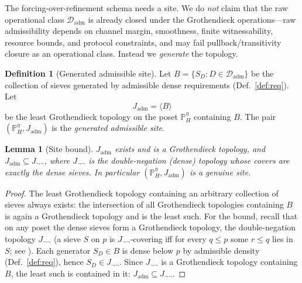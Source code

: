 \documentclass[11pt]{article}
\newtheorem{lemma}{Lemma}
\theoremstyle{definition}
\newtheorem{definition}{Definition}
\theoremstyle{remark}
\newcommand{\PHeta}{\mathbb{P}_{H}^{\eta}}
\newcommand{\refines}{\leq}
\newcommand{\Dadm}{\mathcal{D}_{\mathrm{adm}}}
\newcommand{\Jadm}{J_{\mathrm{adm}}}
\newcommand{\Jnn}{J_{\neg\neg}}
\begin{document}
The forcing-over-refinement schema needs a site. We do \emph{not} claim that the raw operational
class $\Dadm$ is already closed under the Grothendieck operations---raw admissibility depends on
channel margin, smoothness, finite witnessability, resource bounds, and protocol constraints, and may
fail pullback/transitivity closure as an operational class. Instead we \emph{generate} the topology.

\begin{definition}[Generated admissible site]\label{def:site}
Let $B=\{S_D:D\in\Dadm\}$ be the collection of sieves generated by admissible dense requirements
(Def.~\ref{def:req}). Let
\[
  \Jadm=\langle B\rangle
\]
be the least Grothendieck topology on the poset $\PHeta$ containing $B$. The pair $(\PHeta,\Jadm)$ is
the \emph{generated admissible site}.
\end{definition}


\begin{lemma}[Site bound]\label{lem:sitebound}
$\Jadm$ exists and is a Grothendieck topology, and $\Jadm\subseteq\Jnn$, where $\Jnn$ is the
double-negation (dense) topology whose covers are exactly the dense sieves. In particular
$(\PHeta,\Jadm)$ is a genuine site.
\end{lemma}

\begin{proof}
The least Grothendieck topology containing an arbitrary collection of sieves always exists: the
intersection of all Grothendieck topologies containing $B$ is again a Grothendieck topology and is
the least such. For the bound, recall that on any poset the dense sieves form a Grothendieck topology,
the double-negation topology $\Jnn$ (a sieve $S$ on $p$ is $\Jnn$-covering iff for every $q\refines p$
some $r\refines q$ lies in $S$; see \cite{maclane-moerdijk}). Each generator $S_D\in B$ is dense below
$p$ by admissible density (Def.~\ref{def:req}), hence $S_D\in\Jnn$. Since $\Jnn$ is a Grothendieck
topology containing $B$, the least such is contained in it: $\Jadm\subseteq\Jnn$.
\end{proof}
\end{document}
